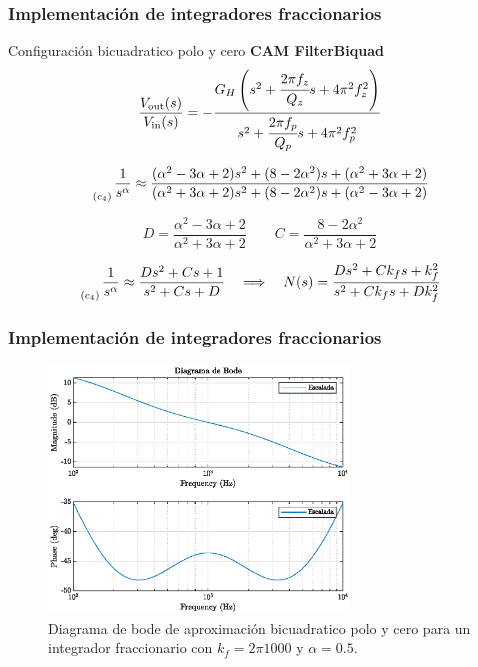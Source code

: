 \documentclass[10pt]{beamer}
\begin{document}
	\begin{frame}
		\frametitle{Implementación de integradores fraccionarios}
		\begin{block}{Configuración bicuadratico polo y cero}
		\textbf{CAM FilterBiquad}
			\begin{equation}
		\frac{V_{\mathrm{out}} (s)}{V_{\mathrm{in}}(s)} = - \frac{G_{H} \left(  s^{2} + \cfrac{2 \pi f_{z}}{Q_{z}} s + 4 \pi^{2} f_{z}^{2} \right)}{s^{2} + \cfrac{2 \pi f_{p}}{Q_{p}}s + 4\pi^{2} f_{p}^{2} }
		\label{ec:CAM_biquad}
	\end{equation}
	
	\begin{equation}
		\genfrac{}{}{0pt}{0}{}{_{(c_{4})}} \frac{1}{s^{\alpha}} \approx \frac{(\alpha^{2} - 3\alpha + 2) s^{2} + (8 - 2 \alpha^{2})s + (\alpha^{2} + 3\alpha + 2) }{(\alpha^{2} + 3\alpha + 2) s^{2} + (8 - 2 \alpha^{2})s + (\alpha^{2} - 3\alpha + 2)}
		\label{ec:CFE_segundo_orden}
	\end{equation}
	
	\begin{equation}
		D = \frac{\alpha^{2} - 3 \alpha + 2}{\alpha^{2} + 3\alpha + 2} \qquad C = \frac{8 - 2 \alpha^{2}}{\alpha^{2} +  3 \alpha + 2}
	\end{equation}
	
	\begin{equation}
		\genfrac{}{}{0pt}{0}{}{_{(c_{4})}} \frac{1}{s^{\alpha}} \approx  \frac{D s^{2} + Cs + 1}{s^{2} + Cs + D} \quad \Longrightarrow \quad  N(s) = \frac{D s^{2} + C k_{f}s + k_{f}^{2}}{s^{2} + C k_{f}s + Dk_{f}^{2}}
		\label{ec:CFE_segundo_orden_2}
	\end{equation}
		\end{block}
	\end{frame}
	\begin{frame}
		\frametitle{Implementación de integradores fraccionarios}
		\begin{figure}[hbtp]
		\caption{Diagrama de bode de aproximación bicuadratico polo y cero para un integrador fraccionario con $k_{f} = 2\pi 1000$ y  $\alpha = 0.5$.} 
		\label{fig:V19_segundo_orden_esc}
		\centering
		\includegraphics[width=8cm]{../imagenes/V19_segundo_orden_esc.eps}
	\end{figure}
	\end{frame}
\end{document}
